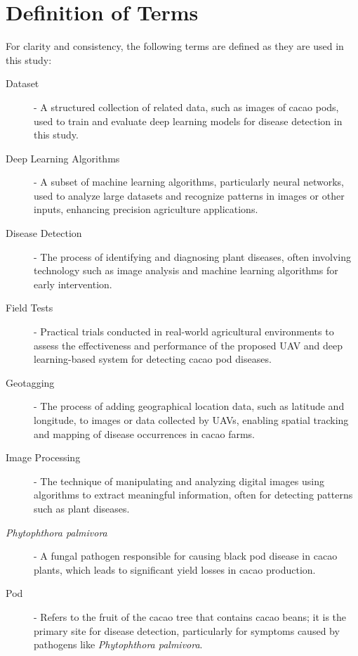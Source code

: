 {\section{Definition of Terms}

For clarity and consistency, the following terms are defined as they are used in this study:

\begin{description}
	\item[Dataset] - A structured collection of related data, such as images of cacao pods, used to train and evaluate deep learning models for disease detection in this study.

	\item[Deep Learning Algorithms] - A subset of machine learning algorithms, particularly neural networks, used to analyze large datasets and recognize patterns in images or other inputs, enhancing precision agriculture applications.

	\item[Disease Detection] - The process of identifying and diagnosing plant diseases, often involving technology such as image analysis and machine learning algorithms for early intervention.

	\item[Field Tests] - Practical trials conducted in real-world agricultural environments to assess the effectiveness and performance of the proposed UAV and deep learning-based system for detecting cacao pod diseases.

	\item[Geotagging] - The process of adding geographical location data, such as latitude and longitude, to images or data collected by UAVs, enabling spatial tracking and mapping of disease occurrences in cacao farms.

	\item[Image Processing] - The technique of manipulating and analyzing digital images using algorithms to extract meaningful information, often for detecting patterns such as plant diseases.

	\item[\textit{Phytophthora palmivora}] - A fungal pathogen responsible for causing black pod disease in cacao plants, which leads to significant yield losses in cacao production.

	\item[Pod] - Refers to the fruit of the cacao tree that contains cacao beans; it is the primary site for disease detection, particularly for symptoms caused by pathogens like \textit{Phytophthora palmivora}.


\end{description}}

